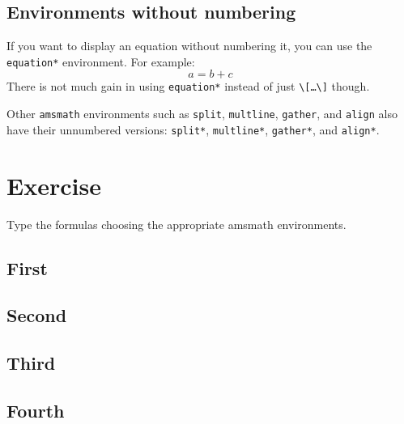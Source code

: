 \subsection{Environments without numbering}
\par If you want to display an equation without numbering it, you can use the \verb"equation*" environment. For example:
\begin{equation*}
    a=b+c
\end{equation*}
There is not much gain in using \verb"equation*" instead of just \verb"\[…\]" though.

Other \verb"amsmath" environments such as \verb"split", \verb"multline", \verb"gather", and \verb"align" also have their unnumbered versions: \verb"split*", \verb"multline*", \verb"gather*", and \verb"align*".

\section{Exercise}
\begin{staticpart}
Type the formulas choosing the appropriate amsmath environments.
\subsection{First}

\subsection{Second}

\subsection{Third}

\subsection{Fourth}

\end{staticpart}

